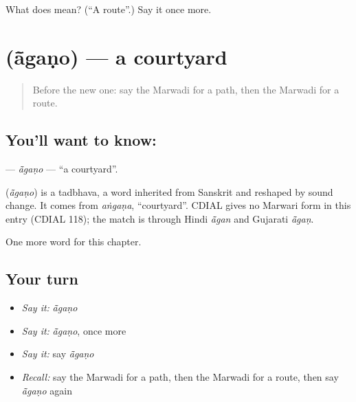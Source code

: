 \begin{tcolorbox}[breakable,colback=teal!4,colframe=teal!35!black,title={Before you move on}]
What does  mean? (\textquotedblleft{}A route\textquotedblright{}.) Say it once more.
\end{tcolorbox}
\section[\texorpdfstring{\mw{आंगणो} (ā̃gaṇo)}{आंगणो (ā̃gaṇo)}]{ (ā̃gaṇo) — a courtyard}

\label{lesson:MW-C99-agano}



\begin{quote}
Before the new one: say the Marwadi for a path, then the Marwadi for a route.
\end{quote}

\subsection*{You'll want to know: }
\textbf{} — \emph{ā̃gaṇo} — \textquotedblleft{}a courtyard\textquotedblright{}.

\begin{cousinweb}
\textbf{} (\emph{ā̃gaṇo}) is a tadbhava, a word inherited from Sanskrit and reshaped by sound change. It comes from \emph{aṅgaṇa}, \textquotedblleft{}courtyard\textquotedblright{}. CDIAL gives no Marwari form in this entry (CDIAL 118); the match is through Hindi \emph{ã̄gan} and Gujarati \emph{ã̄gaṇ}.
\end{cousinweb}

\begin{grammarlens}[title={What you've built}]
One more word for this chapter.
\end{grammarlens}

\subsection*{Your turn}
\begin{itemize}
\raggedright
  \item \emph{Say it:} \emph{ā̃gaṇo}
  \item \emph{Say it:} \emph{ā̃gaṇo}, once more
  \item \emph{Say it:} say \emph{ā̃gaṇo}
  \item \emph{Recall:} say the Marwadi for a path, then the Marwadi for a route, then say \emph{ā̃gaṇo} again
\end{itemize}

